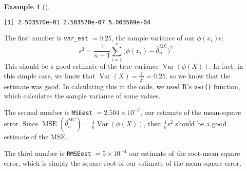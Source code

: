 \documentclass[
  letterpaper,
  DIV=11,
  numbers=noendperiod]{scrreprt}
\theoremstyle{plain}
\theoremstyle{definition}
\theoremstyle{definition}
\newtheorem{example}{Example}[chapter]
\theoremstyle{remark}
\begin{document}
\begin{example}[]
\begin{verbatim}
[1] 2.503570e-01 2.503570e-07 5.003569e-04
\end{verbatim}

The first number is \texttt{var\_est} \(= 0.25\), the sample variance of
our \(\phi(x_i)\)s:\\
\[ s^2 = \frac{1}{n-1} \sum_{i=1}^n \big(\phi(x_i) - \widehat{\theta}_n^{\mathrm{MC}}\big)^2 . \]
This should be a good estimate of the true variance
\(\operatorname{Var}(\phi(X))\). In fact, in this simple case, we know
that \(\operatorname{Var}(X) = \frac{1}{2^2} = 0.25\), so we know that
the estimate was good. In calculating this in the code, we used R's
\texttt{var()} function, which calculates the sample variance of some
values.

The second number is \texttt{MSEest}
\(= \ensuremath{2.504\times 10^{-7}}\), our estimate of the mean-square
error. Since
\(\operatorname{MSE}(\widehat{\theta}_n^{\mathrm{MC}}) = \frac{1}{n} \operatorname{Var}(\phi(X))\),
then \(\frac{1}{n} s^2\) should be a good estimate of the MSE.

The third number is \texttt{RMSEest} \(= \ensuremath{5\times 10^{-4}}\)
our estimate of the root-mean square error, which is simply the
square-root of our estimate of the mean-square error.

\end{example}
\end{document}

